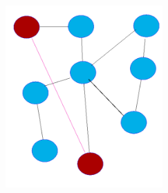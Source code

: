 \begin{figure}[H]
\begin{minipage}[b]{0.2\textwidth}
	    \includegraphics[width=\textwidth]{season3/303/images/dots2.png}
	  \end{minipage}
	\end{figure}

